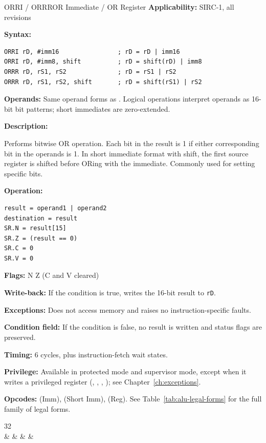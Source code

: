 \begin{instructionbox}{ORRI / ORRR}{OR Immediate / OR Register}
	\textbf{Applicability:} SIRC-1, all revisions

	\textbf{Syntax:}
	\begin{lstlisting}
ORRI rD, #imm16                ; rD = rD | imm16
ORRI rD, #imm8, shift          ; rD = shift(rD) | imm8
ORRR rD, rS1, rS2              ; rD = rS1 | rS2
ORRR rD, rS1, rS2, shift       ; rD = shift(rS1) | rS2
\end{lstlisting}

	\textbf{Operands:} Same operand forms as . Logical operations interpret operands as 16-bit bit
	patterns; short immediates are zero-extended.

	\textbf{Description:}

	Performs bitwise OR operation. Each bit in the result is 1 if either corresponding bit in the operands is 1. In short
	immediate format with shift, the first source register is shifted before ORing with the immediate. Commonly used for
	setting specific bits.

	\textbf{Operation:}
	\begin{verbatim}
result = operand1 | operand2
destination = result
SR.N = result[15]
SR.Z = (result == 0)
SR.C = 0
SR.V = 0
\end{verbatim}

	\textbf{Flags:} N Z (C and V cleared)

	\textbf{Write-back:} If the condition is true, writes the 16-bit result to \texttt{rD}.

	\textbf{Exceptions:} Does not access memory and raises no instruction-specific faults.

	\textbf{Condition field:} If the condition is false, no result is written and status flags are preserved.

	\textbf{Timing:} 6 cycles, plus instruction-fetch wait states.

	\textbf{Privilege:} Available in protected mode and supervisor mode, except when it writes a
	privileged register (, , , ); see Chapter~\ref{ch:exceptions}.

	\textbf{Opcodes:}  (Imm),  (Short Imm),  (Reg). See Table~\ref{tab:alu-legal-forms} for the full family of legal forms.

	\begin{center}
		\begin{bytefield}[bitwidth=1.1em]{32}
			 \\
			 &
			 &
			 &
			 &
		\end{bytefield}
	\end{center}


\end{instructionbox}
